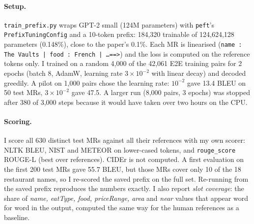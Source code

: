 \documentclass[11pt]{article}
\begin{document}
\paragraph{Setup.} \texttt{train\_prefix.py} wraps GPT-2 small (124M parameters) with \texttt{peft}'s \texttt{PrefixTuningConfig} and a 10-token prefix: 184,320 trainable of 124,624,128 parameters (0.148\%), close to the paper's 0.1\%. Each MR is linearised (\texttt{name : The Vaults | food : French | \dots ==>}) and the loss is computed on the reference tokens only. I trained on a random 4,000 of the 42,061 E2E training pairs for 2 epochs (batch 8, AdamW, learning rate $3\times10^{-2}$ with linear decay) and decoded greedily. A pilot on 1,000 pairs chose the learning rate: $10^{-2}$ gave 13.4 BLEU on 50 test MRs, $3\times10^{-2}$ gave 47.5. A larger run (8,000 pairs, 3 epochs) was stopped after 380 of 3,000 steps because it would have taken over two hours on the CPU.

\paragraph{Scoring.} I score all 630 distinct test MRs against all their references with my own scorer: NLTK BLEU, NIST and METEOR on lower-cased tokens, and \texttt{rouge\_score} ROUGE-L (best over references). CIDEr is not computed. A first evaluation on the first 200 test MRs gave 55.7 BLEU, but those MRs cover only 10 of the 18 restaurant names, so I re-scored the saved prefix on the full set. Re-running from the saved prefix reproduces the numbers exactly. I also report \emph{slot coverage}: the share of \textit{name, eatType, food, priceRange, area} and \textit{near} values that appear word for word in the output, computed the same way for the human references as a baseline.
\end{document}
